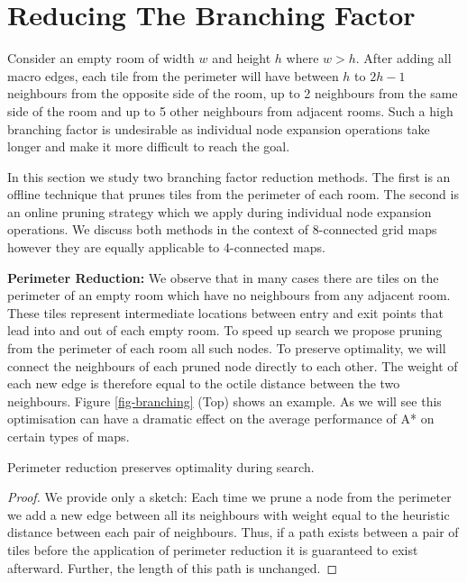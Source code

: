 \section{Reducing The Branching Factor}
Consider an empty room of width $w$ and height $h$ where $w > h$.  After adding
all macro edges, each tile from the perimeter will have between $h$ to $2h-1$
neighbours from the opposite side of the room, up to 2 neighbours from the same
side of the room and up to 5 other neighbours from adjacent rooms.  Such a high
branching factor is undesirable as individual node expansion operations take
longer and make it more difficult to reach the goal.  \par In this section we
study two branching factor reduction methods.  The first is an offline technique
that prunes tiles from the perimeter of each room.  The second is an online
pruning strategy which we apply during individual node expansion operations.  We
discuss both methods in the context of 8-connected grid maps however they are
equally applicable to 4-connected maps.
\\ \par \noindent
\textbf{Perimeter Reduction:}
We observe that in many cases there are tiles on the perimeter of an empty room which have no neighbours from any 
adjacent room. 
These tiles represent intermediate locations between entry and exit points that lead into and out of each empty room.
To speed up search we propose pruning from the perimeter of each room all such nodes.
To preserve optimality, we will connect the neighbours of each pruned node directly to each other.
The weight of each new edge is therefore equal to the octile distance between the two neighbours.
Figure \ref{fig-branching} (Top) shows an example.
As we will see this optimisation can have a dramatic effect on the average performance of
A* on certain types of maps.

\begin{lemma}
Perimeter reduction preserves optimality during search.
\end{lemma}
\begin{proof}
We provide only a sketch:
Each time we prune a node from the perimeter we add a new edge between all its
neighbours with weight equal to the heuristic distance between each pair of 
neighbours.
Thus, if a path exists between a pair of tiles before the application of
perimeter reduction it is guaranteed to exist afterward.
Further, the length of this path is unchanged.
\end{proof}

